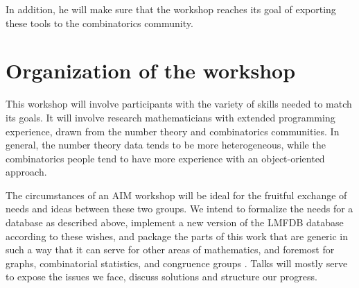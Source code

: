 \documentclass{article}
\begin{document}
In addition, he will make sure that the workshop reaches its goal of exporting these tools to the combinatorics community.

\section{Organization of the workshop}
This workshop will involve participants with the variety of skills needed to match its goals. It will involve research mathematicians with extended programming experience, drawn from the number theory and combinatorics communities. In general, the number theory data tends to be more heterogeneous, while the combinatorics people tend to have more experience with an object-oriented approach. 

The circumstances of an AIM workshop will be ideal for the fruitful exchange of needs and ideas between these two groups.  We intend to formalize the needs for a database as described above, implement a new version of the LMFDB database according to these wishes, and package the parts of this work  that are generic in such a way that it can serve for other areas of mathematics, and foremost for  graphs, combinatorial statistics, and congruence groups \cite{congruence}. Talks will mostly serve to expose the issues we face, discuss solutions and structure our progress.

 

\end{document}
